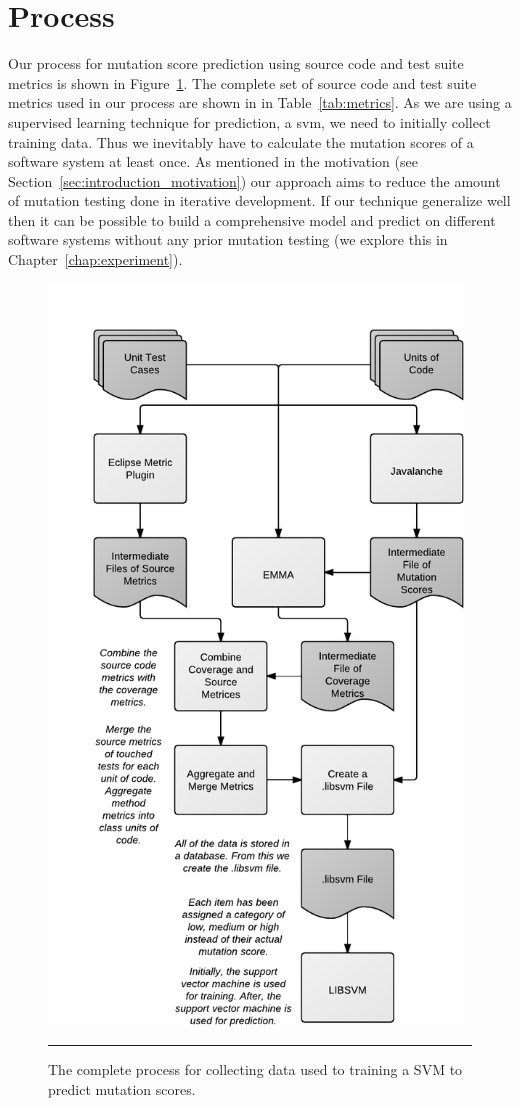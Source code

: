 \section{Process}
\label{sec:approach_process}
Our process for mutation score prediction using source code and test suite metrics is shown in Figure~\ref{fig:process}. The complete set of source code and test suite metrics used in our process are shown in in Table~\ref{tab:metrics}. As we are using a supervised learning technique for prediction, a \gls{svm}, we need to initially collect training data. Thus we inevitably have to calculate the mutation scores of a software system at least once. As mentioned in the motivation (see Section~\ref{sec:introduction_motivation}) our approach aims to reduce the amount of mutation testing done in iterative development. If our technique generalize well then it can be possible to build a comprehensive model and predict on different software systems without any prior mutation testing (we explore this in Chapter~\ref{chap:experiment}).

\begin{figure}[h]
  \centering
  \includegraphics[width=11cm]{figures/process.pdf}
  \caption{The complete process for collecting data used to training a SVM to predict mutation scores.}
  \label{fig:process}
  \vspace{2mm}
  \hrule
\end{figure}

